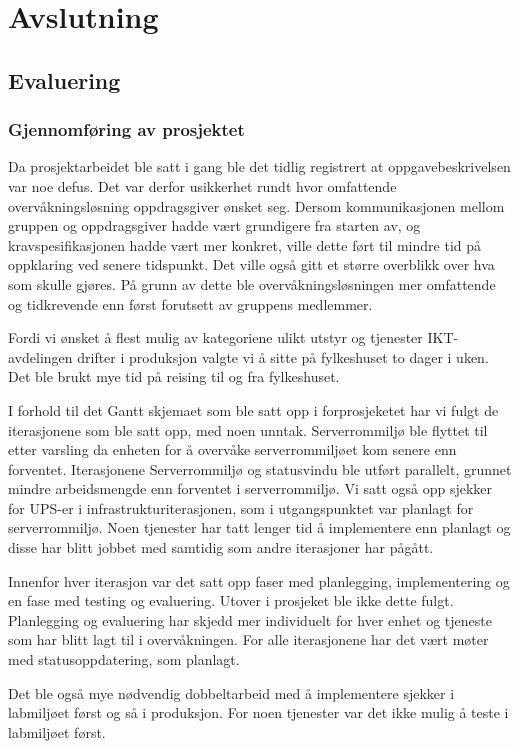 \chapter{Avslutning}
\section{Evaluering}
\subsection{Gjennomføring av prosjektet}
Da prosjektarbeidet ble satt i gang ble det tidlig registrert at oppgavebeskrivelsen var noe defus. Det var derfor usikkerhet rundt hvor omfattende overvåkningsløsning oppdragsgiver ønsket seg. Dersom kommunikasjonen mellom gruppen og oppdragsgiver hadde vært grundigere fra starten av, og kravspesifikasjonen hadde vært mer konkret, ville dette ført til mindre tid på oppklaring ved senere tidspunkt. Det ville også gitt et større overblikk over hva som skulle gjøres. På grunn av dette ble overvåkningsløsningen mer omfattende og tidkrevende enn først forutsett av gruppens medlemmer.

Fordi vi ønsket å flest mulig av kategoriene ulikt utstyr og tjenester IKT-avdelingen drifter i produksjon valgte vi å sitte på fylkeshuset to dager i uken. Det ble brukt mye tid på reising til og fra fylkeshuset.

I forhold til det Gantt skjemaet som ble satt opp i forprosjeketet har vi fulgt de iterasjonene som ble satt opp, med noen unntak. Serverrommiljø ble flyttet til etter varsling da enheten for å overvåke serverrommiljøet kom senere enn forventet. Iterasjonene Serverrommiljø og statusvindu ble utført parallelt, grunnet mindre arbeidsmengde enn forventet i serverrommiljø. Vi satt også opp sjekker for UPS-er i infrastrukturiterasjonen, som i utgangspunktet var planlagt for serverrommiljø. Noen tjenester har tatt lenger tid å implementere enn planlagt og disse har blitt jobbet med samtidig som andre iterasjoner har pågått.

Innenfor hver iterasjon var det satt opp faser med planlegging, implementering og en fase med testing og evaluering. Utover i prosjeket ble ikke dette fulgt. Planlegging og evaluering har skjedd mer individuelt for hver enhet og tjeneste som har blitt lagt til i overvåkningen. For alle iterasjonene har det vært møter med statusoppdatering, som planlagt. 

Det ble også mye nødvendig dobbeltarbeid med å implementere sjekker i labmiljøet først og så i produksjon. For noen tjenester var det ikke mulig å teste i labmiljøet først.

